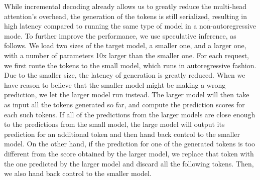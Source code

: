 While incremental decoding already allows us to greatly reduce the multi-head attention's overhead, the generation of the tokens is still serialized, resulting in high latency compared to running the same type of model in a non-autoregressive mode. To further improve the performance, we use speculative inference, as follows. We load two sizes of the target model, a smaller one, and a larger one, with a number of parameters 10x larger than the smaller one. For each request, we first route the tokens to the small model, which runs in autoregressive fashion. Due to the smaller size, the latency of generation is greatly reduced. When we have reason to believe that the smaller model might be making a wrong prediction, we let the larger model run instead. The larger model will then take as input all the tokens generated so far, and compute the prediction scores for each such tokens. If all of the predictions from the larger models are close enough to the predictions from the small model, the large model will output its prediction for an additional token and then hand back control to the smaller model. On the other hand, if the prediction for one of the generated tokens is too different from the score obtained by the larger model, we replace that token with the one predicted by the larger model and discard all the following tokens. Then, we also hand back control to the smaller model.
